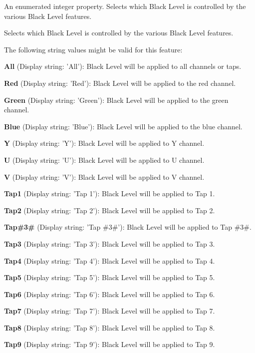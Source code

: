 An enumerated integer property. Selects which Black Level is controlled by the various Black Level features. 

Selects which Black Level is controlled by the various Black Level features.

The following string values might be valid for this feature\+:
\begin{DoxyItemize}
\item {\bfseries All} (Display string\+: 'All')\+: Black Level will be applied to all channels or taps.
\item {\bfseries Red} (Display string\+: 'Red')\+: Black Level will be applied to the red channel.
\item {\bfseries Green} (Display string\+: 'Green')\+: Black Level will be applied to the green channel.
\item {\bfseries Blue} (Display string\+: 'Blue')\+: Black Level will be applied to the blue channel.
\item {\bfseries Y} (Display string\+: 'Y')\+: Black Level will be applied to Y channel.
\item {\bfseries U} (Display string\+: 'U')\+: Black Level will be applied to U channel.
\item {\bfseries V} (Display string\+: 'V')\+: Black Level will be applied to V channel.
\item {\bfseries Tap1} (Display string\+: 'Tap 1')\+: Black Level will be applied to Tap 1.
\item {\bfseries Tap2} (Display string\+: 'Tap 2')\+: Black Level will be applied to Tap 2.
\item {\bfseries Tap\#3\#} (Display string\+: 'Tap \#3\#')\+: Black Level will be applied to Tap \#3\#.
\item {\bfseries Tap3} (Display string\+: 'Tap 3')\+: Black Level will be applied to Tap 3.
\item {\bfseries Tap4} (Display string\+: 'Tap 4')\+: Black Level will be applied to Tap 4.
\item {\bfseries Tap5} (Display string\+: 'Tap 5')\+: Black Level will be applied to Tap 5.
\item {\bfseries Tap6} (Display string\+: 'Tap 6')\+: Black Level will be applied to Tap 6.
\item {\bfseries Tap7} (Display string\+: 'Tap 7')\+: Black Level will be applied to Tap 7.
\item {\bfseries Tap8} (Display string\+: 'Tap 8')\+: Black Level will be applied to Tap 8.
\item {\bfseries Tap9} (Display string\+: 'Tap 9')\+: Black Level will be applied to Tap 9.

\end{DoxyItemize}
